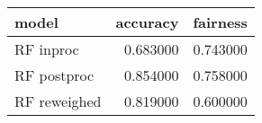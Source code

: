 \begin{tabular}{lrr}
\toprule
model & accuracy & fairness \\
\midrule
RF inproc & 0.683000 & 0.743000 \\
RF postproc & 0.854000 & 0.758000 \\
RF reweighed & 0.819000 & 0.600000 \\
\bottomrule
\end{tabular}
